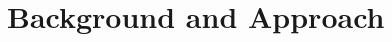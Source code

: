 \documentclass[acmsmall,screen,review,anonymous]{acmart}
\begin{document}
%
%
%
%
%
%
%
%
%
%


\section{Background and Approach} \label{sec:overview} %
\end{document}
